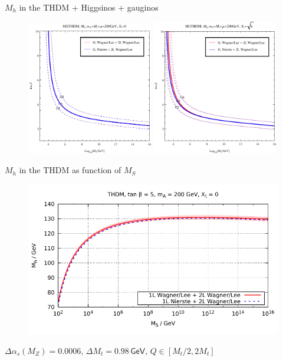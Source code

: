 \documentclass[hyperref={pdfpagelabels=false},ngerman]{beamer}
\newcommand{\eh}[1]{\,\mathsf{#1}}
\begin{document}
\begin{frame}{$M_h$ in the THDM + Higgsinos + gauginos}
  \begin{figure}
    \centering
    \includegraphics[width=0.49\textwidth]{plots/THDM/HGTHDMIIMSSMBC_Xt-0_combined}
    \includegraphics[width=0.49\textwidth]{plots/THDM/HGTHDMIIMSSMBC_Xt-Sqrt[6]_combined}
  \end{figure}
\end{frame}

\begin{frame}{$M_h$ in the THDM as function of $M_S$}
  \begin{figure}
    \centering
    \includegraphics[width=\textwidth]{plots/THDM/scale_THDM_Xt-0}
  \end{figure}
  $\Delta \alpha_s(M_Z) = 0.0006$, $\Delta M_t = 0.98 \eh{GeV}$, $Q\in
  [M_t/2,2M_t]$
\end{frame}
\end{document}
